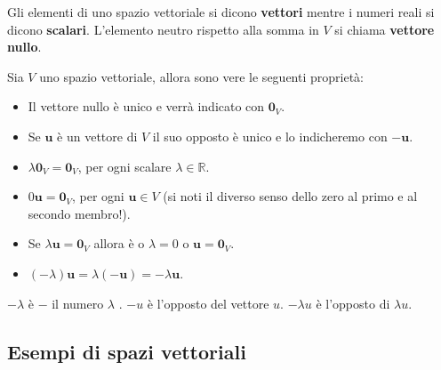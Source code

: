 \documentclass[
  a4paper,
]{article}
\begin{document}
Gli elementi di uno spazio vettoriale si dicono \textbf{vettori} mentre
i numeri reali si dicono \textbf{scalari}. L'elemento neutro rispetto
alla somma in \(V\) si chiama \textbf{vettore nullo}.

\begin{observationbox}
Sia \(V\) uno spazio vettoriale, allora sono vere le seguenti proprietà:

\begin{itemize}
\item
  Il vettore nullo è unico e verrà indicato con \(\mathbf{0}_V\).
\item
  Se \(\mathbf{u}\) è un vettore di \(V\) il suo opposto è unico e lo
  indicheremo con \(-\mathbf{u}\).
\item
  \(\lambda \mathbf{0}_V = \mathbf{0}_V\), per ogni scalare
  \(\lambda \in \mathbb{R}\).
\item
  \(0\mathbf{u}=\mathbf{0}_V\), per ogni \(\mathbf{u}\in V\) (si noti il
  diverso senso dello zero al primo e al secondo membro!).
\item
  Se \(\lambda\mathbf{u}=\mathbf{0}_V\) allora è o \(\lambda=0\) o
  \(\mathbf{u}=\mathbf{0}_V\).
\item
  \((-\lambda)\mathbf{u}=\lambda(-\mathbf{u})=-\lambda\mathbf{u}\).
\end{itemize}
\end{observationbox}

\begin{notebox}
\(-\lambda\) è \(-\) il numero \(\lambda\) . \(-u\) è l'opposto del
vettore \(u\). \(-\lambda u\) è l'opposto di \(\lambda u\).
\end{notebox}

\hypertarget{esempi-di-spazi-vettoriali}{%
\subsection{Esempi di spazi
vettoriali}\label{esempi-di-spazi-vettoriali}}
\end{document}
